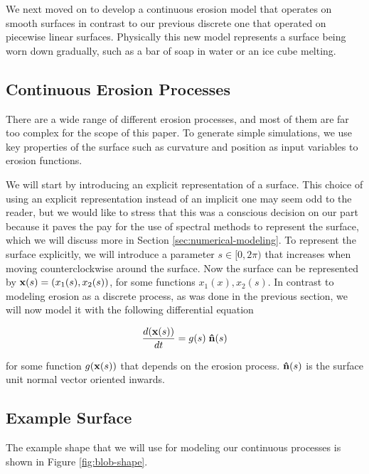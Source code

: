 
We next moved on to develop a continuous erosion model that operates on smooth surfaces in contrast to our previous discrete one that operated on piecewise linear surfaces. Physically this new model represents a surface being worn down gradually, such as a bar of soap in water or an ice cube melting. 

\subsection*{Continuous Erosion Processes}

There are a wide range of different erosion processes, and most of them are far too complex for the scope of this paper. To generate simple simulations, we use key properties of the surface such as curvature and position as input variables to erosion functions.

We will start by introducing an explicit representation of a surface. This choice of using an explicit representation instead of an implicit one may seem odd to the reader, but we would like to stress that this was a conscious decision on our part because it paves the pay for the use of spectral methods to represent the surface, which we will discuss more in Section \ref{sec:numerical-modeling}. To represent the surface explicitly, we will introduce a parameter $s \in [0, 2\pi)$ that increases when moving counterclockwise around the surface. Now the surface can be represented by $\mathbf{x}(s) = (x_1(s), x_2(s))$, for some functions $x_1(x), x_2(s)$. In contrast to modeling erosion as a discrete process, as was done in the previous section, we will now model it with the following differential equation

\begin{equation}
\label{eq:erosion-diff-eq}
\frac{d(\mathbf{x}(s))}{dt} = g(s) \; \mathbf{\hat{n}}(s)
\end{equation}

for some function $g(\mathbf{x}(s))$ that depends on the erosion process. $\mathbf{\hat{n}}(s)$ is the surface unit normal vector oriented inwards.

\subsection*{Example Surface}

The example shape that we will use for modeling our continuous processes is shown in Figure \ref{fig:blob-shape}.

